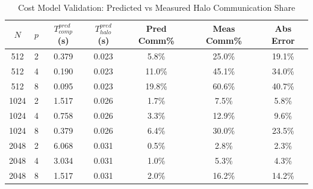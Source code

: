 \begin{table}[htbp]
\centering
\small
\caption{Cost Model Validation: Predicted vs Measured Halo Communication Share}
\label{tab:cost_model}
\begin{tabular}{ccccccc}
\hline
\textbf{$N$} & \textbf{$p$} & \textbf{$T_{comp}^{pred}$ (s)} & \textbf{$T_{halo}^{pred}$ (s)} & \textbf{Pred Comm\%} & \textbf{Meas Comm\%} & \textbf{Abs Error} \\
\hline
512 & 2 & 0.379 & 0.023 & 5.8\% & 25.0\% & 19.1\% \\
512 & 4 & 0.190 & 0.023 & 11.0\% & 45.1\% & 34.0\% \\
512 & 8 & 0.095 & 0.023 & 19.8\% & 60.6\% & 40.7\% \\
1024 & 2 & 1.517 & 0.026 & 1.7\% & 7.5\% & 5.8\% \\
1024 & 4 & 0.758 & 0.026 & 3.3\% & 12.9\% & 9.6\% \\
1024 & 8 & 0.379 & 0.026 & 6.4\% & 30.0\% & 23.5\% \\
2048 & 2 & 6.068 & 0.031 & 0.5\% & 2.8\% & 2.3\% \\
2048 & 4 & 3.034 & 0.031 & 1.0\% & 5.3\% & 4.3\% \\
2048 & 8 & 1.517 & 0.031 & 2.0\% & 16.2\% & 14.2\% \\
\hline
\end{tabular}
\end{table}
